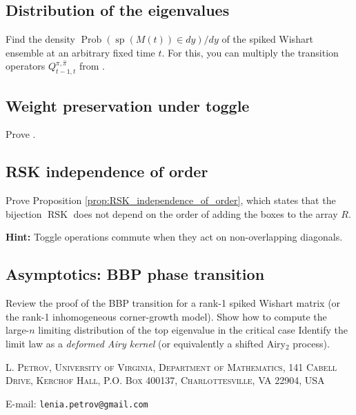 \documentclass[letterpaper,11pt,oneside,reqno]{article}
\numberwithin{equation}{section}
\theoremstyle{definition}
\begin{document}
\subsection{Distribution of the eigenvalues}
\label{prob:Wishart_non_null}

Find the density
$\operatorname{Prob}\left( \operatorname{sp}(M(t))\in dy \right)/dy$
of the spiked Wishart ensemble
at an arbitrary fixed time $t$.
For this, you can multiply the transition operators
$Q^{\pi,\hat\pi}_{t-1,t}$ from .


\subsection{Weight preservation under toggle}
\label{prob:toggle_weight_preservation}

Prove .


\subsection{RSK independence of order}
\label{prob:RSK_independence_of_order}

Prove Proposition \ref{prop:RSK_independence_of_order}, which states that the bijection $\operatorname{RSK}$ does not depend on the order of adding the boxes to the array $R$.

\medskip
\noindent
\textbf{Hint:} Toggle operations commute when they act on non-overlapping diagonals.




\subsection{Asymptotics: BBP phase transition}
Review the proof of the BBP transition for a rank-1 spiked
Wishart matrix (or the rank-1 inhomogeneous corner-growth
model).  Show how to compute the large-\(n\) limiting
distribution of the top eigenvalue in the critical case
Identify the
limit law as a \emph{deformed Airy kernel} (or equivalently
a shifted Airy$_2$ process).








\medskip

\textsc{L. Petrov, University of Virginia, Department of Mathematics, 141 Cabell Drive, Kerchof Hall, P.O. Box 400137, Charlottesville, VA 22904, USA}

E-mail: \texttt{lenia.petrov@gmail.com}
\end{document}
